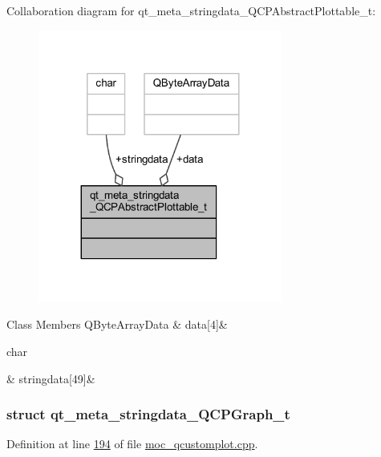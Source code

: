 Collaboration diagram for qt\+\_\+meta\+\_\+stringdata\+\_\+\+Q\+C\+P\+Abstract\+Plottable\+\_\+t\+:
\nopagebreak
\begin{figure}[H]
\begin{center}
\leavevmode
\includegraphics[width=227pt]{dc/de6/a00167}
\end{center}
\end{figure}
\begin{DoxyFields}{Class Members}
\hypertarget{a00016_ac951832cc81d6220c552b96fc4354c89}{Q\+Byte\+Array\+Data}\label{a00016_ac951832cc81d6220c552b96fc4354c89}
&
data\mbox{[}4\mbox{]}&
\\
\hline

\hypertarget{a00016_ab78c50bc348c723bab72ef878f28856c}{char}\label{a00016_ab78c50bc348c723bab72ef878f28856c}
&
stringdata\mbox{[}49\mbox{]}&
\\
\hline

\end{DoxyFields}
\label{d5/d1e/a00103}
\hypertarget{a00016_d5/d1e/a00103}{}
\subsubsection{struct qt\+\_\+meta\+\_\+stringdata\+\_\+\+Q\+C\+P\+Graph\+\_\+t}


Definition at line \hyperlink{a00016_source_l00194}{194} of file \hyperlink{a00016_source}{moc\+\_\+qcustomplot.\+cpp}.



